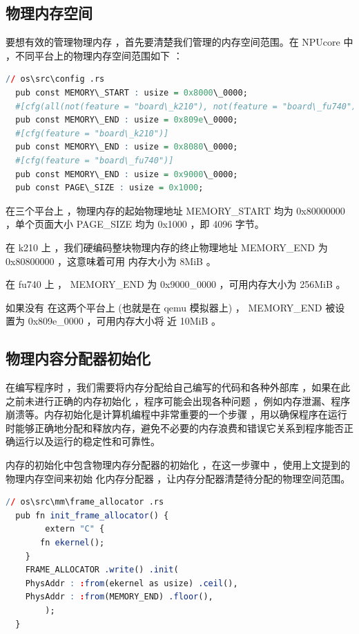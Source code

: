 	
	\subsection{物理内存空间}
	
	要想有效的管理物理内存 ，首先要清楚我们管理的内存空间范围。在 NPUcore 中 ，不同平台上的物理内存空间范围如下 ：
	
	\begin{lstlisting}[language=R]
  // os\src\config .rs
  pub const MEMORY\_START : usize = 0x8000\_0000;
  #[cfg(all(not(feature = "board\_k210"), not(feature = "board\_fu740")))]
  pub const MEMORY\_END : usize = 0x809e\_0000;
  #[cfg(feature = "board\_k210")]
  pub const MEMORY\_END : usize = 0x8080\_0000;
  #[cfg(feature = "board\_fu740")]
  pub const MEMORY\_END : usize = 0x9000\_0000;
  pub const PAGE\_SIZE : usize = 0x1000;
    \end{lstlisting}

	在三个平台上 ，物理内存的起始物理地址 MEMORY\_START 均为  0x80000000 ，单个页面大小 PAGE\_SIZE 均为 0x1000 ，即 4096 字节。
	
	在 k210 上 ，我们硬编码整块物理内存的终止物理地址 MEMORY\_END 为 0x80800000 ，这意味着可用 内存大小为  8MiB 。
	
	在 fu740 上 ，   MEMORY\_END 为  0x9000\_0000 ，可用内存大小为 256MiB 。
	
	如果没有 在这两个平台上  (也就是在 qemu 模拟器上)  ，   MEMORY\_END 被设置为  0x809e\_0000 ，可用内存大小将  近 10MiB 。	
	\subsection{物理内容分配器初始化}
	
	在编写程序时 ，我们需要将内存分配给自己编写的代码和各种外部库 ，如果在此之前未进行正确的内存初始化 ，程序可能会出现各种问题 ，例如内存泄漏、程序崩溃等。内存初始化是计算机编程中非常重要的一个步骤 ，用以确保程序在运行时能够正确地分配和释放内存，避免不必要的内存浪费和错误它关系到程序能否正确运行以及运行的稳定性和可靠性。
	
	内存的初始化中包含物理内存分配器的初始化 ，在这一步骤中 ，使用上文提到的物理内存空间来初始 化内存分配器 ，让内存分配器清楚待分配的物理空间范围。
	
	\begin{lstlisting}[language=R]
  // os\src\mm\frame_allocator .rs
  pub fn init_frame_allocator() {
    	extern "C" {
	   fn ekernel();
    }
    FRAME_ALLOCATOR .write() .init(
    PhysAddr : :from(ekernel as usize) .ceil(),
    PhysAddr : :from(MEMORY_END) .floor(),
    	);
  }
	\end{lstlisting}
	
